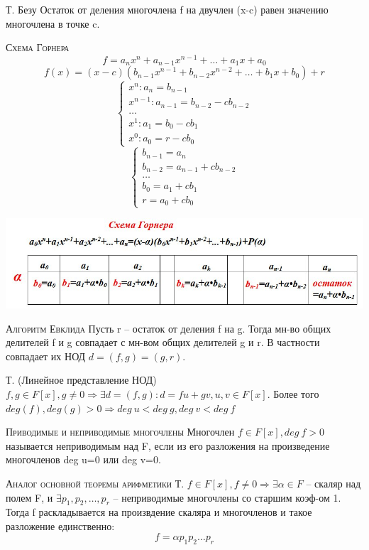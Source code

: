 \documentclass{article}
\begin{document}
Т. Безу Остаток от деления многочлена f на двучлен (x-c) равен значению многочлена в точке c.

\textsc{Схема Горнера}
$$f=a_nx^n+a_{n-1}x^{n-1}+\dots+a_1x+a_0$$
$$f(x)=(x-c)(b_{n-1}x^{n-1}+b_{n-2}x^{n-2}+\dots+b_1x+b_0)+r$$
\begin{equation*}
    \begin{cases}
        x^n: a_n=b_{n-1} \\
        x^{n-1}: a_{n-1}=b_{n-2}-cb_{n-2} \\
        \dots \\
        x^1: a_1=b_0-cb_1 \\
        x^0: a_0=r-cb_0
    \end{cases}
\end{equation*}
\begin{equation*}
    \begin{cases}
        b_{n-1}=a_n \\
        b_{n-2}=a_{n-1}+cb_{n-2} \\
        \dots \\
        b_0=a_1+cb_1 \\
        r=a_0+cb_0
    \end{cases}
\end{equation*}

\centerline{\includegraphics[width=0.7\linewidth]{gr62.jpeg}}

\textsc{Алгоритм Евклида}
Пусть r – остаток от деления f на g. Тогда мн-во общих делителей f и g совпадает с мн-вом общих делителей g и r. В частности совпадает их НОД $d=(f,g)=(g,r)$.

Т. (Линейное представление НОД) $f, g\in F[x], g\neq 0\Rightarrow\exists d=(f,g)\colon d=fu+gv, u,v\in F[x]$. Более того $deg(f), deg(g)>0\Rightarrow deg\ u<deg\ g, deg\ v<deg\ f$

\textsc{Приводимые и неприводимые многочлены}
Многочлен $f\in F[x], deg\ f>0$ называется неприводимым над F, если из его разложения на произведение многочленов deg u=0 или deg v=0.

\textsc{Аналог основной теоремы арифметики}
Т. $f\in F[x], f\neq 0\Rightarrow\exists\alpha\in F$ – скаляр над полем F, и $\exists p_1,p_2,\dots,p_r$ – неприводимые многочлены со старшим коэф-ом 1. Тогда f раскладывается на произвдение скаляра и многочленов и такое разложение единственно:
$$f=\alpha p_1p_2\dots p_r$$
\end{document}
